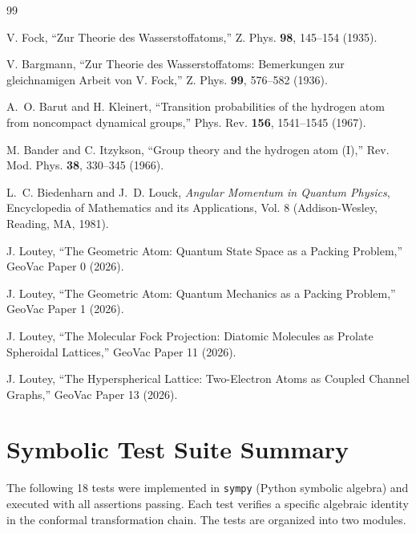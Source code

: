 \documentclass[aps,pra,twocolumn,superscriptaddress,longbibliography]{revtex4-2}
\begin{document}
\begin{thebibliography}{99}

V. Fock,
``Zur Theorie des Wasserstoffatoms,''
Z. Phys. \textbf{98}, 145--154 (1935).

V. Bargmann,
``Zur Theorie des Wasserstoffatoms: Bemerkungen zur gleichnamigen Arbeit von V. Fock,''
Z. Phys. \textbf{99}, 576--582 (1936).

A.~O. Barut and H. Kleinert,
``Transition probabilities of the hydrogen atom from noncompact dynamical groups,''
Phys. Rev. \textbf{156}, 1541--1545 (1967).

M. Bander and C. Itzykson,
``Group theory and the hydrogen atom (I),''
Rev. Mod. Phys. \textbf{38}, 330--345 (1966).

L.~C. Biedenharn and J.~D. Louck,
\textit{Angular Momentum in Quantum Physics},
Encyclopedia of Mathematics and its Applications, Vol. 8 (Addison-Wesley, Reading, MA, 1981).

J. Loutey,
``The Geometric Atom: Quantum State Space as a Packing Problem,''
GeoVac Paper 0 (2026).

J. Loutey,
``The Geometric Atom: Quantum Mechanics as a Packing Problem,''
GeoVac Paper 1 (2026).

J. Loutey,
``The Molecular Fock Projection: Diatomic Molecules as Prolate
Spheroidal Lattices,''
GeoVac Paper 11 (2026).

J. Loutey,
``The Hyperspherical Lattice: Two-Electron Atoms as Coupled Channel
Graphs,''
GeoVac Paper 13 (2026).

\end{thebibliography}


\appendix

\section{Symbolic Test Suite Summary}
\label{app:tests}

The following 18 tests were implemented in \texttt{sympy} (Python symbolic algebra) and executed with all assertions passing. Each test verifies a specific algebraic identity in the conformal transformation chain. The tests are organized into two modules.
\end{document}

